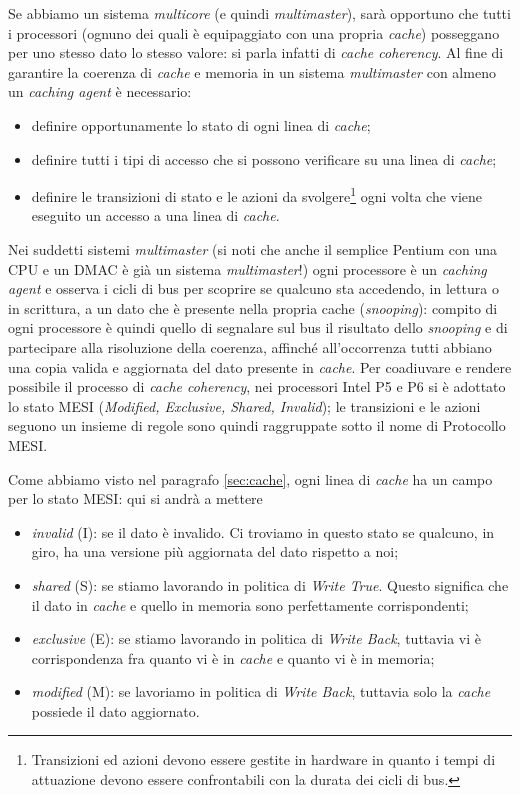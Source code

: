 Se abbiamo un sistema \textit{multicore} (e quindi \textit{multimaster}), sarà opportuno che tutti i processori (ognuno dei quali è equipaggiato con una propria \textit{cache}) posseggano per uno stesso dato lo stesso valore: si parla infatti di \textit{cache coherency}. Al fine di garantire la coerenza di \textit{cache} e memoria in un sistema \textit{multimaster} con almeno un \textit{caching agent} è necessario:
\begin{itemize}
\item  definire opportunamente lo stato di ogni linea di \textit{cache};
\item  definire tutti i tipi di accesso che si possono verificare su una linea di \textit{cache};
\item  definire le transizioni di stato e le azioni da svolgere\footnote{Transizioni ed azioni devono essere gestite in hardware in quanto i tempi di attuazione devono essere confrontabili con la durata dei cicli di bus.} ogni volta che viene eseguito un accesso a una linea di \textit{cache}.
\end{itemize}
Nei suddetti sistemi \textit{multimaster} (si noti che anche il semplice Pentium con una CPU e un DMAC è già un sistema \textit{multimaster}!) ogni processore è un \textit{caching agent} e osserva i cicli di bus per scoprire se qualcuno sta accedendo, in lettura o in scrittura, a un dato che è presente nella propria cache (\textit{snooping}): compito di ogni processore è quindi quello di segnalare sul bus il risultato dello \textit{snooping} e di partecipare alla risoluzione della coerenza, affinché all'occorrenza tutti abbiano una copia valida e aggiornata del dato presente in \textit{cache}.
Per coadiuvare e rendere possibile il processo di \textit{cache coherency}, nei processori Intel P5 e P6 si è adottato lo stato MESI (\textit{Modified, Exclusive, Shared, Invalid}); le transizioni e le azioni seguono un insieme di regole sono quindi raggruppate sotto il nome di Protocollo MESI. 

Come abbiamo visto nel paragrafo \ref{sec:cache}, ogni linea di \textit{cache} ha un campo per lo stato MESI: qui si andrà a mettere
\begin{itemize}
\item \textit{invalid} (I): se il dato è invalido. Ci troviamo in questo stato se qualcuno, in giro, ha una versione più aggiornata del dato rispetto a noi;
\item \textit{shared} (S): se stiamo lavorando in politica di \textit{Write True}. Questo significa che il dato in \textit{cache} e quello in memoria sono perfettamente corrispondenti;
\item \textit{exclusive} (E): se stiamo lavorando in politica di \textit{Write Back}, tuttavia vi è corrispondenza fra quanto vi è in \textit{cache} e quanto vi è in memoria;
\item \textit{modified} (M): se lavoriamo in politica di \textit{Write Back}, tuttavia solo la \textit{cache} possiede il dato aggiornato.
\end{itemize}

